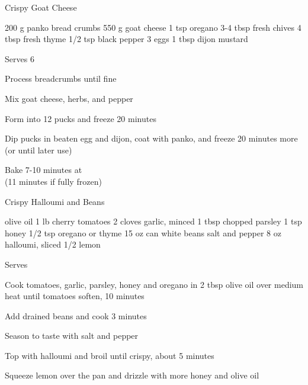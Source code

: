 \begin{recipe}{Crispy Goat Cheese}{}
\begin{ingredients}
200 g panko bread crumbs
550 g goat cheese
1 tsp oregano
3-4 tbsp fresh chives
4 tbsp fresh thyme
1/2 tsp black pepper
3 eggs
1 tbsp dijon mustard
\end{ingredients}
\nextcolumn
Serves 6
\begin{steps}
\item Process breadcrumbs until fine
\item Mix goat cheese, herbs, and pepper
\item Form into 12 pucks and freeze 20 minutes
\item Dip pucks in beaten egg and dijon, coat with panko, and freeze 20 minutes more \\(or until later use)
\item Bake 7-10 minutes at  \\(11 minutes if fully frozen)
\end{steps}
\end{recipe}

\begin{recipe}{Crispy Halloumi and Beans}{\vegetarian{}}
\begin{ingredients}
olive oil
1 lb cherry tomatoes
2 cloves garlic, minced
1 tbsp chopped parsley
1 tsp honey
1/2 tsp oregano or thyme
15 oz can white beans
salt and pepper
8 oz halloumi, sliced
1/2 lemon
\end{ingredients}
\nextcolumn
Serves
\begin{steps}
    \item Cook tomatoes, garlic, parsley, honey and oregano in 2 tbsp olive oil over medium heat until tomatoes soften, 10 minutes
    \item Add drained beans and cook 3 minutes
    \item Season to taste with salt and pepper
    \item Top with halloumi and broil until crispy, about 5 minutes
    \item Squeeze lemon over the pan and drizzle with more honey and olive oil
\end{steps}
\end{recipe}
